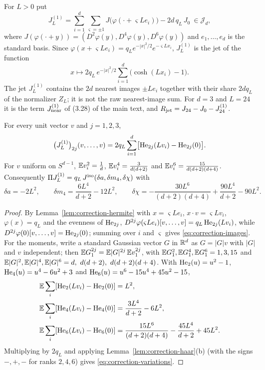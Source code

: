 \begin{definition}\label{def:correction-nearest}
For $L>0$ put
\begin{equation}\label{eq:correction-J1}
J^{(1)}_L=\sum_{i=1}^d\sum_{\varsigma=\pm1}J\bigl(\varphi(\cdot+\varsigma Le_i)\bigr)-2d\,q_L\,J_0\ \in\mathcal J_d ,
\end{equation}
where $J(\varphi(\cdot+y))=(D^2\varphi(y),D^4\varphi(y),D^6\varphi(y))$ and $e_1,\dots,e_d$ is the standard basis. Since $\varphi(x+\varsigma Le_i)=q_Le^{-|x|^2/2}e^{-\varsigma Lx_i}$, $J^{(1)}_L$ is the jet of the function
\[
x\longmapsto2q_L\,e^{-|x|^2/2}\sum_{i=1}^d\bigl(\cosh(Lx_i)-1\bigr).
\]
The jet $J^{(1)}_L$ contains the $2d$ nearest images $\pm Le_i$ together with their share $2dq_L$ of the normalizer $Z_L$; it is not the raw nearest-image sum. For $d=3$ and $L=24$ it is the term $J^{(1)}_{\rm near}$ of (3.28) of the main text, and $R_{\rm jet}=J_{24}-J_0-J^{(1)}_{24}$.
\end{definition}

\begin{lemma}\label{lem:correction-images}
For every unit vector $v$ and $j=1,2,3$,
\begin{equation}\label{eq:correction-images}
\bigl(J^{(1)}_L\bigr)_{2j}(v,\dots,v)=2q_L\sum_{i=1}^d\bigl[\operatorname{He}_{2j}(Lv_i)-\operatorname{He}_{2j}(0)\bigr].
\end{equation}
For $v$ uniform on $S^{d-1}$, $\mathbb E v_i^2=\frac1d$, $\mathbb E v_i^4=\frac3{d(d+2)}$ and $\mathbb E v_i^6=\frac{15}{d(d+2)(d+4)}$. Consequently $\Pi J^{(1)}_L=q_L\,J^{\rm iso}(\delta a,\delta m_4,\delta\chi)$ with
\begin{equation}\label{eq:correction-variations}
\delta a=-2L^2,\qquad \delta m_4=\frac{6L^4}{d+2}-12L^2,\qquad \delta\chi=-\frac{30L^6}{(d+2)(d+4)}+\frac{90L^4}{d+2}-90L^2 .
\end{equation}
\end{lemma}

\begin{proof}
By Lemma~\ref{lem:correction-hermite} with $x=\varsigma Le_i$, $x\cdot v=\varsigma Lv_i$, $\varphi(x)=q_L$ and the evenness of $\operatorname{He}_{2j}$, $D^{2j}\varphi(\varsigma Le_i)[v,\dots,v]=q_L\operatorname{He}_{2j}(Lv_i)$, while $D^{2j}\varphi(0)[v,\dots,v]=\operatorname{He}_{2j}(0)$; summing over $i$ and $\varsigma$ gives \eqref{eq:correction-images}. For the moments, write a standard Gaussian vector $G$ in $\mathbb R^d$ as $G=|G|v$ with $|G|$ and $v$ independent; then $\mathbb E G_1^{2j}=\mathbb E|G|^{2j}\,\mathbb E v_1^{2j}$, with $\mathbb E G_1^2,\mathbb E G_1^4,\mathbb E G_1^6=1,3,15$ and $\E|G|^2,\E|G|^4,\E|G|^6=d,\ d(d+2),\ d(d+2)(d+4)$. With $\operatorname{He}_2(u)=u^2-1$, $\operatorname{He}_4(u)=u^4-6u^2+3$ and $\operatorname{He}_6(u)=u^6-15u^4+45u^2-15$,
\begin{align*}
\mathbb E\sum_i[\operatorname{He}_2(Lv_i)-\operatorname{He}_2(0)]&=L^2,\\
\mathbb E\sum_i[\operatorname{He}_4(Lv_i)-\operatorname{He}_4(0)]&=\frac{3L^4}{d+2}-6L^2,\\
\mathbb E\sum_i[\operatorname{He}_6(Lv_i)-\operatorname{He}_6(0)]&=\frac{15L^6}{(d+2)(d+4)}-\frac{45L^4}{d+2}+45L^2 .
\end{align*}
Multiplying by $2q_L$ and applying Lemma~\ref{lem:correction-haar}(b) (with the signs $-,+,-$ for ranks $2,4,6$) gives \eqref{eq:correction-variations}.
\end{proof}


